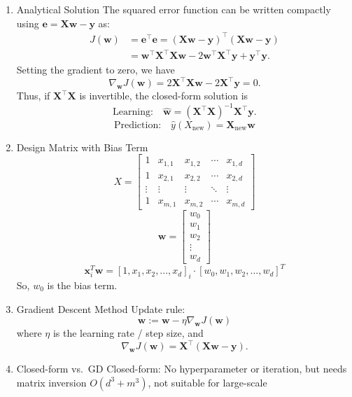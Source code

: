 \documentclass[
]{ctexart}
\begin{document}
\begin{enumerate}
  Removing constants w.r.t. \(\mathbf{w}\), we have
  \[\mathbf{w}_{MLE} = \arg \min_{\mathbf{w}} \ \sum_{i=1}^{m} (y_i - \mathbf{w}^\top \mathbf{x}_i)^2.\]
\item
  Analytical Solution The squared error function can be written
  compactly using \(\mathbf{e} = \mathbf{Xw} - \mathbf{y}\) as: \[
   \begin{aligned}
   J(\mathbf{w}) &= \mathbf{e}^\top \mathbf{e} = (\mathbf{Xw} - \mathbf{y})^\top (\mathbf{Xw} - \mathbf{y}) \\
   &= \mathbf{w}^\top \mathbf{X}^\top \mathbf{Xw} - 2\mathbf{w}^\top \mathbf{X}^\top \mathbf{y} + \mathbf{y}^\top \mathbf{y}.
   \end{aligned}
   \] Setting the gradient to zero, we have
  \[\nabla_{\mathbf{w}} J(\mathbf{w}) = 2\mathbf{X}^\top \mathbf{Xw} - 2\mathbf{X}^\top \mathbf{y} = 0.\]
  Thus, if \(\mathbf{X}^\top \mathbf{X}\) is invertible, the closed-form
  solution is
  \[\text{Learning:} \quad \hat{\mathbf{w}} = (\mathbf{X}^\top \mathbf{X})^{-1} \mathbf{X}^\top \mathbf{y}.\]
  \[\text{Prediction:} \quad \hat{y}(X_\text{new}) = \mathbf{X}_{\text{new}}\hat{\mathbf{w}}\]
\item
  Design Matrix with Bias Term \[X = \begin{bmatrix}
   1 & x_{1,1} & x_{1,2} & \cdots & x_{1,d} \\
   1 & x_{2,1} & x_{2,2} & \cdots & x_{2,d} \\
   \vdots & \vdots & \vdots & \ddots & \vdots \\
   1 & x_{m,1} & x_{m,2} & \cdots & x_{m,d}
   \end{bmatrix}\] \[\mathbf{w} = \begin{bmatrix}
   w_0 \\
   w_1 \\
   w_2 \\
   \vdots \\
   w_d
   \end{bmatrix}\]
  \[\mathbf{x}_i^T \mathbf{w} = [1,x_1,x_2,...,x_d]_i \cdot [w_0,w_1,w_2,...,w_d]^T\]
  So, \(w_0\) is the bias term.
\item
  Gradient Descent Method Update rule:
  \[\mathbf{w} := \mathbf{w} - \eta \nabla_{\mathbf{w}} J(\mathbf{w})\]
  where \(\eta\) is the learning rate / step size, and
  \[\nabla_{\mathbf{w}} J(\mathbf{w}) = \mathbf{X}^\top (\mathbf{Xw} - \mathbf{y}).\]
\item
  Closed-form vs.~GD Closed-form: No hyperparameter or iteration, but
  needs matrix inversion \(O(d^3+m^3)\), not suitable for large-scale

\end{enumerate}
\end{document}
